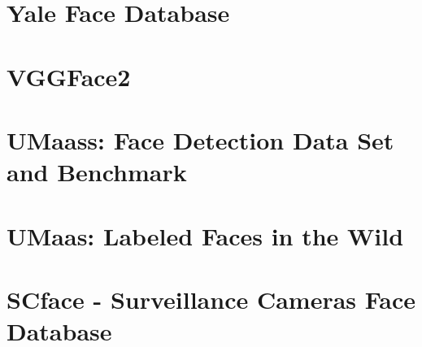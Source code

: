\section{Yale Face Database}

\section{VGGFace2}

\section{UMaass: Face Detection Data Set and Benchmark}

\section{UMaas: Labeled Faces in the Wild}

\section{SCface - Surveillance Cameras Face Database}

